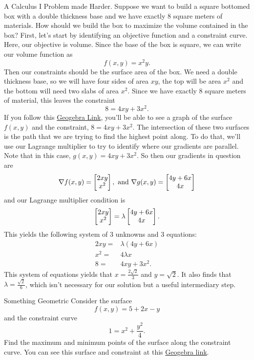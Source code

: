 \begin{example}{A Calculus I Problem made Harder.}
Suppose we want to build a square bottomed box with a double thickness base and we have exactly $8$ square meters of materials. How should we build the box to maximize the volume contained in the box? First, let's start by identifying an objective function and a constraint curve. Here, our objective is volume. Since the base of the box is square, we can write our volume function as $$f(x,y)=x^2y.$$
Then our constraints should be the surface area of the box. We need a double thickness base, so we will have four sides of area $xy$, the top will be area $x^2$ and the bottom will need two slabs of area $x^2$. Since we have exactly 8 square meters of material, this leaves the constraint $$8=4xy+3x^2. $$ If you follow this \href{https://www.geogebra.org/3d/azxkj796}{Geogebra Link}, you'll be able to see a graph of the surface $f(x,y)$ and the constraint, $8=4xy+3x^2$. The intersection of these two surfaces is the path that we are trying to find the highest point along. To do that, we'll use our Lagrange multiplier to try to identify where our gradients are parallel. Note that in this case, $g(x,y)=4xy+3x^2$. So then our gradients in question are $$\nabla f(x,y)=\begin{bmatrix}2xy\\x^2\end{bmatrix}, \text{ and }\nabla g(x,y)=\begin{bmatrix}4y+6x\\4x\end{bmatrix} $$
and our Lagrange multiplier condition is $$\begin{bmatrix}2xy\\x^2\end{bmatrix}=\lambda\begin{bmatrix}4y+6x\\4x\end{bmatrix}. $$
This yields the following system of 3 unknowns and 3 equations:
\begin{align*}
2xy=&\lambda(4y+6x)\\
x^2=&4\lambda x\\
8=&4xy+3x^2.
\end{align*}
This system of equations yields that $x=\frac{2\sqrt{2}}{3}$ and $y=\sqrt{2}$. It also finds that $\lambda=\frac{\sqrt{2}}{6}$, which isn't necessary for our solution but a useful intermediary step. 
\end{example}

\begin{exercise}{Something Geometric}
Consider the surface $$f(x,y)=5+2x-y$$ and the constraint curve $$1=x^2+\frac{y^2}{4}.$$ Find the maximum and minimum points of the surface along the constraint curve. You can see this surface and constraint at this \href{https://www.geogebra.org/3d/dxtzfpca}{Geogebra link}.
\end{exercise}

